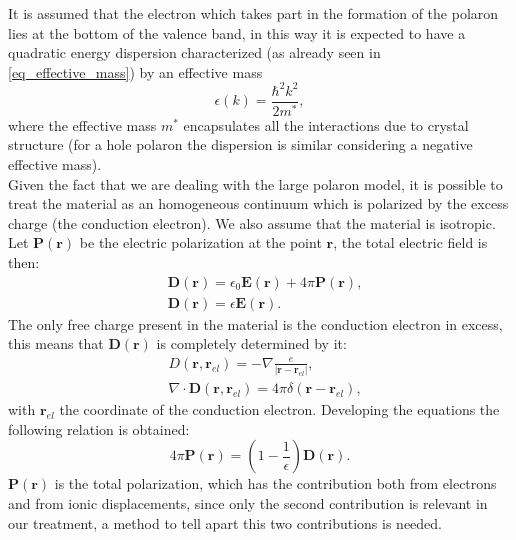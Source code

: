 It is assumed that the electron which takes part in the formation of the polaron lies at the bottom of the valence band, in this way it is 
expected to have a quadratic energy dispersion characterized (as already seen in \ref{eq_effective_mass}) by an effective mass
\begin{equation}
    \epsilon(k)=\frac{\hbar^2k^2}{2m^*},
\end{equation}
where the effective mass $m^*$ encapsulates all the interactions due to crystal structure (for a hole polaron the dispersion is similar 
considering a negative effective mass).\\
Given the fact that we are dealing with the large polaron model, it is possible to treat the material as an homogeneous continuum 
which is polarized by the excess charge (the conduction electron). We also assume that the material is isotropic.
Let $\mathbf{P}(\mathbf{r})$ be the electric polarization at the point $\mathbf{r}$, the total electric field is then:
\begin{equation}
\begin{split}
    &\mathbf{D}(\mathbf{r})=\epsilon_0\mathbf{E}(\mathbf{r})+4\pi \mathbf{P}(\mathbf{r}),\\
    &\mathbf{D}(\mathbf{r})=\epsilon \mathbf{E}(\mathbf{r}).
\end{split}
\end{equation} 
The only free charge present in the material is the conduction electron in excess, this means that $\mathbf{D}(\mathbf{r})$ is completely determined by it:
\begin{equation}
\begin{split}
    &D(\mathbf{r},\mathbf{r}_{el})=-\nabla\frac{e}{|\mathbf{r}-\mathbf{r}_{el}|}, \\
    &\nabla\cdot \mathbf{D}(\mathbf{r},\mathbf{r}_{el})=4\pi\delta(\mathbf{r}-\mathbf{r}_{el}),
\end{split}
\end{equation}
with $\mathbf{r}_{el}$ the coordinate of the conduction electron. Developing the equations the following relation is obtained:
\begin{equation}
    4\pi \mathbf{P}(\mathbf{r}) = \left(1-\frac{1}{\epsilon}\right)\mathbf{D}(\mathbf{r}).
\end{equation}
$\mathbf{P}(\mathbf{r})$ is the total polarization, which has the contribution both from electrons and from ionic displacements, since only the second 
contribution is relevant in our treatment, a method to tell apart this two contributions is needed.\\
